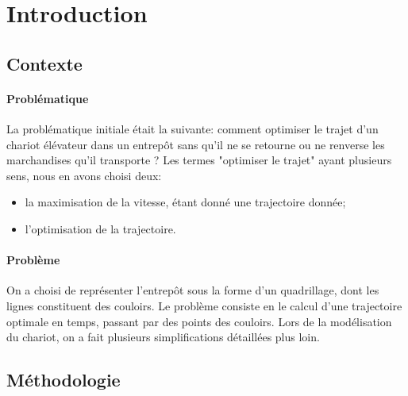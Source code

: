 \section*{Introduction}

\subsection{Contexte}

\paragraph{Problématique}
La problématique initiale était la suivante: comment optimiser le trajet d’un chariot élévateur dans un entrepôt sans qu’il ne se retourne ou ne renverse les marchandises qu’il transporte ? Les termes "optimiser le trajet" ayant plusieurs sens, nous en avons choisi deux:
\begin{itemize}
	\item la maximisation de la vitesse, étant donné une trajectoire donnée;
	\item l'optimisation de la trajectoire.
\end{itemize}
\paragraph{Problème}
On a choisi de représenter l'entrepôt sous la forme d'un quadrillage, dont les lignes constituent des couloirs. Le problème consiste en le calcul d'une trajectoire optimale en temps, passant par des points des couloirs. Lors de la modélisation du chariot, on a fait plusieurs simplifications détaillées plus loin.
\subsection{Méthodologie}
